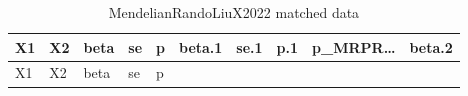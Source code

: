 \documentclass[
]{article}
\begin{document}
\begin{longtable}[]{@{}llllllllll@{}}
\caption{\label{tab:MendelianRandoLiuX2022-matched-data}MendelianRandoLiuX2022 matched data}\tabularnewline
\toprule
\begin{minipage}[b]{0.07\columnwidth}\raggedright
X1\strut
\end{minipage} & \begin{minipage}[b]{0.07\columnwidth}\raggedright
X2\strut
\end{minipage} & \begin{minipage}[b]{0.07\columnwidth}\raggedright
beta\strut
\end{minipage} & \begin{minipage}[b]{0.07\columnwidth}\raggedright
se\strut
\end{minipage} & \begin{minipage}[b]{0.07\columnwidth}\raggedright
p\strut
\end{minipage} & \begin{minipage}[b]{0.07\columnwidth}\raggedright
beta.1\strut
\end{minipage} & \begin{minipage}[b]{0.07\columnwidth}\raggedright
se.1\strut
\end{minipage} & \begin{minipage}[b]{0.07\columnwidth}\raggedright
p.1\strut
\end{minipage} & \begin{minipage}[b]{0.07\columnwidth}\raggedright
p\_MRPR\ldots{}\strut
\end{minipage} & \begin{minipage}[b]{0.07\columnwidth}\raggedright
beta.2\strut
\end{minipage}\tabularnewline
\midrule
\endfirsthead
\toprule
\begin{minipage}[b]{0.07\columnwidth}\raggedright
X1\strut
\end{minipage} & \begin{minipage}[b]{0.07\columnwidth}\raggedright
X2\strut
\end{minipage} & \begin{minipage}[b]{0.07\columnwidth}\raggedright
beta\strut
\end{minipage} & \begin{minipage}[b]{0.07\columnwidth}\raggedright
se\strut
\end{minipage} & \begin{minipage}[b]{0.07\columnwidth}\raggedright
p\strut
\end{minipage} & \begin{minipage}[b]{0.07\columnwidth}\raggedright

\end{minipage}
\end{longtable}
\end{document}
